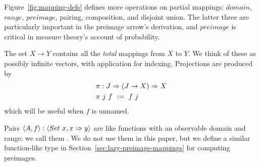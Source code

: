 \documentclass[preprint]{sigplanconf}
\begin{document}
Figure~\ref{fig:mapping-defs} defines more operations on partial mappings: $domain$, $range$, $preimage$, pairing, composition, and disjoint union.
The latter three are particularly important in the preimage arrow's derivation, and $preimage$ is critical in measure theory's account of probability.

The set $X \to Y$ contains all the \emph{total} mappings from $X$ to $Y$.
We think of these as possibly infinite vectors, with application for indexing.
Projections are produced by
\begin{equation}
\begin{aligned}
	&\pi : J \Rightarrow (J \to X) \Rightarrow X \\
	&\pi~j~f \ := \ f~j
\end{aligned}
\end{equation}
which will be useful when $f$ is unnamed.

Pairs $\langle{A,f}\rangle : \langle{Set~x,x \Rightarrow y}\rangle$ are like functions with an observable domain and range; we call them .
We do not use them in this paper, but we define a similar function-like type in Section~\ref{sec:lazy-preimage-mappings} for computing preimages.
\end{document}
